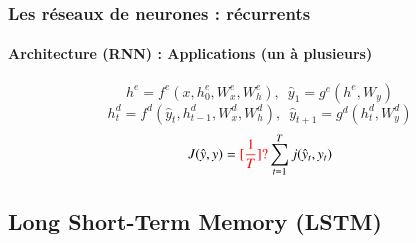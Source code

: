 \documentclass[xcolor=table]{beamer}
\begin{document}
\begin{frame}
	\frametitle{Les réseaux de neurones : récurrents}
	\framesubtitle{Architecture (RNN) : Applications (un à plusieurs)}
	
	\vspace*{-0.5cm}
	\[ h^e = f^e(x, h^e_{0}, W^e_x, W^e_h), \,\,\, \hat{y}_1 = g^e(h^e, W_y)\]
	\[ h^d_{t} = f^d(\hat{y}_{t}, h^d_{t-1}, W^d_x, W^d_h), \,\,\, \hat{y}_{t+1} = g^d(h^d_{t}, W^d_y)\]
	\[ J(\hat{y}, y) = \textcolor{red}{[\frac{1}{T}]?} \sum_{t=1}^{T} j(\hat{y}_{t}, y_t)\]
	
\begin{center}
\end{center}

\end{frame}

\subsection{Long Short-Term Memory (LSTM)}
\end{document}
